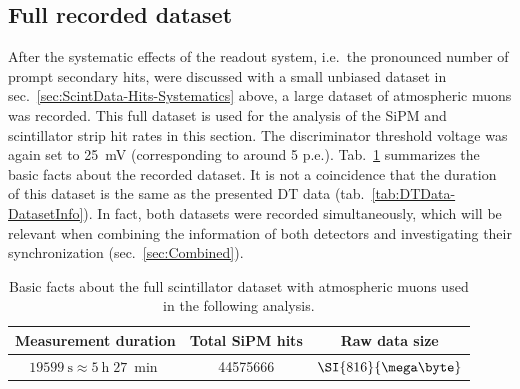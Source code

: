 \subsection{Full recorded dataset}
\label{sec:ScintData-Hits-Dataset}
After the systematic effects of the readout system, i.e.\ the pronounced number of prompt secondary hits, were discussed with a small unbiased dataset in sec.\ \ref{sec:ScintData-Hits-Systematics} above, a large dataset of atmospheric muons was recorded. This full dataset is used for the analysis of the \ac{SiPM} and scintillator strip hit rates in this section. The discriminator threshold voltage was again set to \SI{25}{\milli\volt} (corresponding to around 5 \ac{p.e.}). Tab.\ \ref{tab:ScintData-Full-DatasetInfo} summarizes the basic facts about the recorded dataset. It is not a coincidence that the duration of this dataset is the same as the presented \ac{DT} data (tab.\ \ref{tab:DTData-DatasetInfo}). In fact, both datasets were recorded simultaneously, which will be relevant when combining the information of both detectors and investigating their synchronization (sec.\ \ref{sec:Combined}).
\begin{table}[htb]
    \centering
    \begin{tabular}{|c|c|c|} 
        \hline %
        Measurement duration & Total \ac{SiPM} hits & Raw data size \\ \hline
        $\SI{19599}{\second}\approx\SI{5}{\hour}\;\SI{27}{\min}$ & \num{44575666} & $\SI{816}{\mega\byte}$ \\ \hline
    \end{tabular}
    \caption{Basic facts about the full scintillator dataset with atmospheric muons used in the following analysis.}
    \label{tab:ScintData-Full-DatasetInfo}
\end{table}

